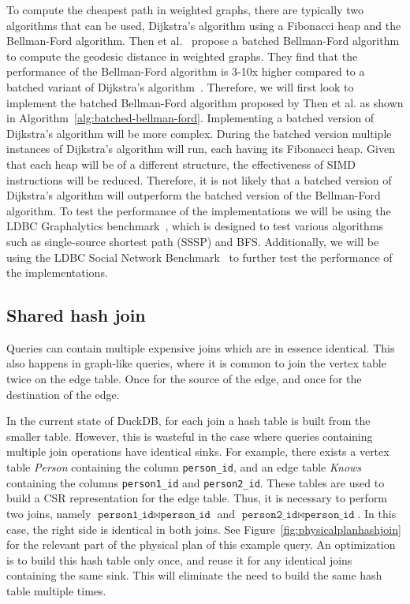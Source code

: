 To compute the cheapest path in weighted graphs, there are typically two algorithms that can be used, Dijkstra's algorithm using a Fibonacci heap and the Bellman-Ford algorithm.
Then et al.~\cite{DBLP:journals/dbsk/ThenGKN17} propose a batched Bellman-Ford algorithm to compute the geodesic distance in weighted graphs. 
They find that the performance of the Bellman-Ford algorithm is 3-10x higher compared to a batched variant of Dijkstra's algorithm~\cite{DBLP:journals/dbsk/ThenGKN17}.
Therefore, we will first look to implement the batched Bellman-Ford algorithm proposed by Then et al. as shown in Algorithm~\ref{alg:batched-bellman-ford}. 
Implementing a batched version of Dijkstra's algorithm will be more complex.
During the batched version multiple instances of Dijkstra's algorithm will run, each having its Fibonacci heap.
Given that each heap will be of a different structure, the effectiveness of SIMD instructions will be reduced. 
Therefore, it is not likely that a batched version of Dijkstra's algorithm will outperform the batched version of the Bellman-Ford algorithm. 
To test the performance of the implementations we will be using the LDBC Graphalytics benchmark~\cite{DBLP:journals/pvldb/IosupHNHPMCCSAT16}, which is designed to test various algorithms such as single-source shortest path (SSSP) and BFS.
Additionally, we will be using the LDBC Social Network Benchmark~\cite{DBLP:journals/corr/abs-2001-02299} to further test the performance of the implementations.

\subsection{Shared hash join}
Queries can contain multiple expensive joins which are in essence identical. This also happens in graph-like queries, where it is common to join the vertex table twice on the edge table. Once for the source of the edge, and once for the destination of the edge. 

In the current state of DuckDB, for each join a hash table is built from the smaller table. 
However, this is wasteful in the case where queries containing multiple join operations have identical sinks. 
For example, there exists a vertex table \textit{Person} containing the column \texttt{person\_id}, and an edge table \textit{Knows} containing the columns \texttt{person1\_id} and \texttt{person2\_id}. These tables are used to build a CSR representation for the edge table. 
Thus, it is necessary to perform two joins, namely $\texttt{person1\_id} \Join \texttt{person\_id}$ and $\texttt{person2\_id} \Join \texttt{person\_id}$. 
In this case, the right side is identical in both joins. 
See Figure~\ref{fig:physicalplanhashjoin} for the relevant part of the physical plan of this example query.
An optimization is to build this hash table only once, and reuse it for any identical joins containing the same sink. 
This will eliminate the need to build the same hash table multiple times.

